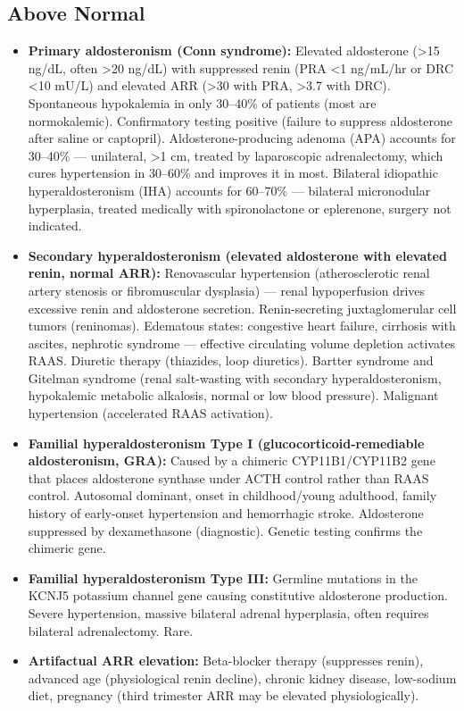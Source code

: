 \subsection*{Above Normal}
\begin{itemize}
  \item \textbf{Primary aldosteronism (Conn syndrome):} Elevated aldosterone (>15 ng/dL, often >20 ng/dL) with suppressed renin (PRA <1 ng/mL/hr or DRC <10 mU/L) and elevated ARR (>30 with PRA, >3.7 with DRC). Spontaneous hypokalemia in only 30--40\% of patients (most are normokalemic). Confirmatory testing positive (failure to suppress aldosterone after saline or captopril). Aldosterone-producing adenoma (APA) accounts for 30--40\% --- unilateral, >1 cm, treated by laparoscopic adrenalectomy, which cures hypertension in 30--60\% and improves it in most. Bilateral idiopathic hyperaldosteronism (IHA) accounts for 60--70\% --- bilateral micronodular hyperplasia, treated medically with spironolactone or eplerenone, surgery not indicated.
  \item \textbf{Secondary hyperaldosteronism (elevated aldosterone with elevated renin, normal ARR):} Renovascular hypertension (atherosclerotic renal artery stenosis or fibromuscular dysplasia) --- renal hypoperfusion drives excessive renin and aldosterone secretion. Renin-secreting juxtaglomerular cell tumors (reninomas). Edematous states: congestive heart failure, cirrhosis with ascites, nephrotic syndrome --- effective circulating volume depletion activates RAAS. Diuretic therapy (thiazides, loop diuretics). Bartter syndrome and Gitelman syndrome (renal salt-wasting with secondary hyperaldosteronism, hypokalemic metabolic alkalosis, normal or low blood pressure). Malignant hypertension (accelerated RAAS activation).
  \item \textbf{Familial hyperaldosteronism Type I (glucocorticoid-remediable aldosteronism, GRA):} Caused by a chimeric CYP11B1/CYP11B2 gene that places aldosterone synthase under ACTH control rather than RAAS control. Autosomal dominant, onset in childhood/young adulthood, family history of early-onset hypertension and hemorrhagic stroke. Aldosterone suppressed by dexamethasone (diagnostic). Genetic testing confirms the chimeric gene.
  \item \textbf{Familial hyperaldosteronism Type III:} Germline mutations in the KCNJ5 potassium channel gene causing constitutive aldosterone production. Severe hypertension, massive bilateral adrenal hyperplasia, often requires bilateral adrenalectomy. Rare.
  \item \textbf{Artifactual ARR elevation:} Beta-blocker therapy (suppresses renin), advanced age (physiological renin decline), chronic kidney disease, low-sodium diet, pregnancy (third trimester ARR may be elevated physiologically).
\end{itemize}

